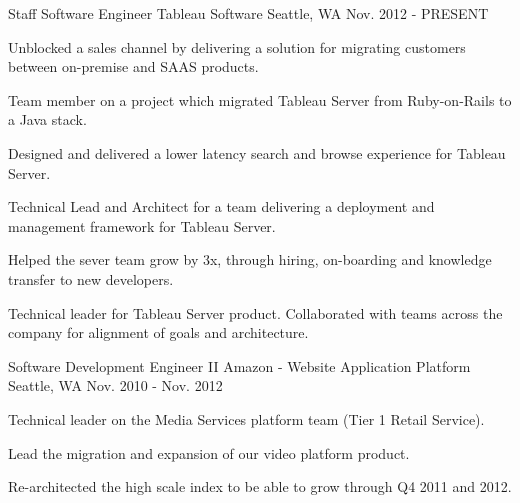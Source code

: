 

\begin{cventries}

  \cventry
    {Staff Software Engineer} %
    {Tableau Software} %
    {Seattle, WA} %
    {Nov. 2012 - PRESENT} %
    {
      \begin{cvitems} %
        \item {Unblocked a sales channel by delivering a solution for migrating customers between on-premise and SAAS products.}
        \item {Team member on a project which migrated Tableau Server from Ruby-on-Rails to a Java stack.}
        \item {Designed and delivered a lower latency search and browse experience for Tableau Server.}
        \item {Technical Lead and Architect for a team delivering a deployment and management framework for Tableau Server.}
        \item {Helped the sever team grow by 3x, through hiring, on-boarding and knowledge transfer to new developers.}
        \item {Technical leader for Tableau Server product. Collaborated with teams across the company for alignment of goals and architecture.}
      \end{cvitems}
    }

  \cventry
    {Software Development Engineer II} %
    {Amazon - Website Application Platform} %
    {Seattle, WA} %
    {Nov. 2010 - Nov. 2012} %
    {
      \begin{cvitems} %
        \item {Technical leader on the Media Services platform team (Tier 1 Retail Service).}
        \item {Lead the migration and expansion of our video platform product.}
        \item {Re-architected the high scale index to be able to grow through Q4 2011 and 2012.}
      \end{cvitems}
    }


\end{cventries}

